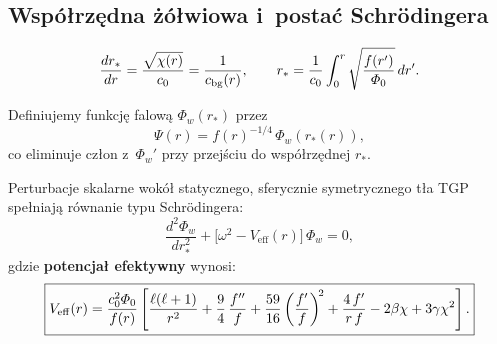 \subsection{Wsp\'o\l{}rz\k{e}dna \.z\'o\l{}wiowa i~posta\'c Schr\"odingera}

\begin{definition}\label{def:tortoise}
\begin{equation}\label{eq:tortoise}
  \frac{dr_*}{dr} = \frac{\sqrt{\chi(r)}}{c_0}
  = \frac{1}{c_{\mathrm{bg}}(r)},
  \qquad r_* = \frac{1}{c_0}\int_0^r
  \sqrt{\frac{f(r')}{\varPhi_0}}\,dr'.
\end{equation}
\end{definition}

Definiujemy funkcj\k{e} falow\k{a} $\Phi_w(r_*)$ przez
\begin{equation}\label{eq:wave-function}
  \Psi(r) = f(r)^{-1/4}\,\Phi_w(r_*(r)),
\end{equation}
co eliminuje cz\l{}on z~$\Phi_w'$ przy przej\'sciu
do wsp\'o\l{}rz\k{e}dnej $r_*$.

\begin{theorem}\label{thm:ringdown}
Perturbacje skalarne wok\'o\l{} statycznego, sferycznie
symetrycznego t\l{}a TGP spe\l{}niaj\k{a} r\'ownanie typu
Schr\"odingera:
\begin{equation}\label{eq:ringdown}
  \boxed{
    \frac{d^2\Phi_w}{dr_*^2}
    + \bigl[\omega^2 - V_{\mathrm{eff}}(r)\bigr]\,\Phi_w = 0,
  }
\end{equation}
gdzie \textbf{potencja\l{} efektywny} wynosi:
\begin{equation}\label{eq:V-eff}
  \boxed{
    V_{\mathrm{eff}}(r) = \frac{c_0^2\varPhi_0}{f(r)}
    \left[
      \frac{\ell(\ell+1)}{r^2}
      + \frac{9}{4}\,\frac{f''}{f}
      + \frac{59}{16}\left(\frac{f'}{f}\right)^{\!2}
      + \frac{4\,f'}{r\,f}
      - 2\beta\chi + 3\gamma\chi^2
    \right].
  }
\end{equation}
\end{theorem}

